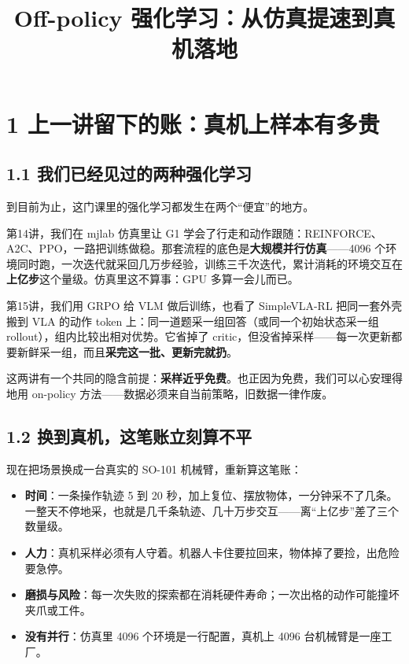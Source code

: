 \documentclass[
  chinese,
]{ctexart}
\title{Off-policy 强化学习：从仿真提速到真机落地}
\author{}
\date{}
\providecommand{\tightlist}{%
  \setlength{\itemsep}{0pt}\setlength{\parskip}{0pt}}
\renewcommand*\contentsname{目录}
\newcommand\contentsname{目录}
\begin{document}
\maketitle

\renewcommand*\contentsname{目录}
{
\hypersetup{linkcolor=}
\setcounter{tocdepth}{3}
\tableofcontents
}

\section{1
上一讲留下的账：真机上样本有多贵}\label{ux4e0aux4e00ux8bb2ux7559ux4e0bux7684ux8d26ux771fux673aux4e0aux6837ux672cux6709ux591aux8d35}

\subsection{1.1
我们已经见过的两种强化学习}\label{ux6211ux4eecux5df2ux7ecfux89c1ux8fc7ux7684ux4e24ux79cdux5f3aux5316ux5b66ux4e60}

到目前为止，这门课里的强化学习都发生在两个``便宜''的地方。

第14讲，我们在 mjlab 仿真里让 G1
学会了行走和动作跟随：REINFORCE、A2C、PPO，一路把训练做稳。那套流程的底色是\textbf{大规模并行仿真}------4096
个环境同时跑，一次迭代就采回几万步经验，训练三千次迭代，累计消耗的环境交互在\textbf{上亿步}这个量级。仿真里这不算事：GPU
多算一会儿而已。

第15讲，我们用 GRPO 给 VLM 做后训练，也看了 SimpleVLA-RL
把同一套外壳搬到 VLA 的动作 token
上：同一道题采一组回答（或同一个初始状态采一组
rollout），组内比较出相对优势。它省掉了
critic，但没省掉采样------每一次更新都要新鲜采一组，而且\textbf{采完这一批、更新完就扔}。

这两讲有一个共同的隐含前提：\textbf{采样近乎免费}。也正因为免费，我们可以心安理得地用
on-policy 方法------数据必须来自当前策略，旧数据一律作废。

\subsection{1.2
换到真机，这笔账立刻算不平}\label{ux6362ux5230ux771fux673aux8fd9ux7b14ux8d26ux7acbux523bux7b97ux4e0dux5e73}

现在把场景换成一台真实的 SO-101 机械臂，重新算这笔账：

\begin{itemize}
\tightlist
\item
  \textbf{时间}：一条操作轨迹 5 到 20
  秒，加上复位、摆放物体，一分钟采不了几条。一整天不停地采，也就是几千条轨迹、几十万步交互------离``上亿步''差了三个数量级。
\item
  \textbf{人力}：真机采样必须有人守着。机器人卡住要拉回来，物体掉了要捡，出危险要急停。
\item
  \textbf{磨损与风险}：每一次失败的探索都在消耗硬件寿命；一次出格的动作可能撞坏夹爪或工件。
\item
  \textbf{没有并行}：仿真里 4096 个环境是一行配置，真机上 4096
  台机械臂是一座工厂。
\end{itemize}
\end{document}
